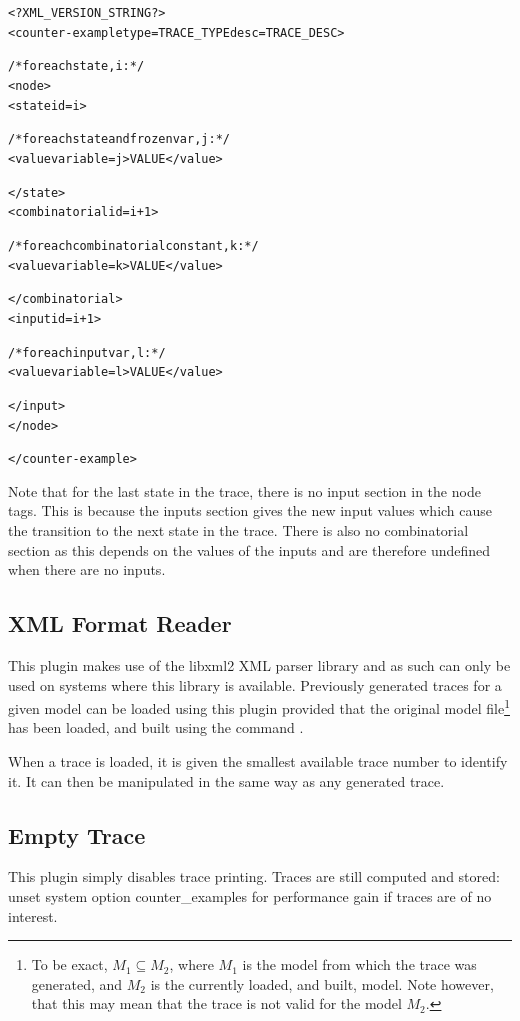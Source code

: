 \begin{alltt}
<?XML_VERSION_STRING?>
<counter-example type=TRACE_TYPE desc=TRACE_DESC>

  /* for each state, i: */
  <node>
    <state id=i>

      /* for each state and frozen var, j: */
      <value variable=j>VALUE</value>

    </state>
    <combinatorial id=i+1>

      /* for each combinatorial constant, k: */
      <value variable=k>VALUE</value>

    </combinatorial>
    <input id=i+1>

      /* for each input var, l: */
      <value variable=l>VALUE</value>

    </input>
  </node>

</counter-example>
\end{alltt}

Note that for the last state in the trace, there is no input section
in the node tags. This is because the inputs section gives the new
input values which cause the transition to the next state in the
trace. There is also no combinatorial section as this depends on the
values of the inputs and are therefore undefined when there are no
inputs.


\subsection{XML Format Reader}
\label{XML Format Reader}

This plugin makes use of the libxml2 XML parser library and as such can
only be used on systems where this library is available. Previously
generated traces for a given model can be loaded using this plugin
provided that the original model file\footnote{To be exact, $M_1
\subseteq M_2$, where $M_1$ is the model from which the trace was
generated, and $M_2$ is the currently loaded, and built, model. Note
however, that this may mean that the trace is not valid for the model
$M_2$.} has been loaded, and built using the command .

When a trace is loaded, it is given the smallest available trace
number to identify it. It can then be manipulated in the same way as
any generated trace.

\subsection{Empty Trace}
\label{Empty Trace}
This plugin simply disables trace printing. Traces are still computed and
stored: unset system option counter\_examples for performance gain if traces are
of no interest.

